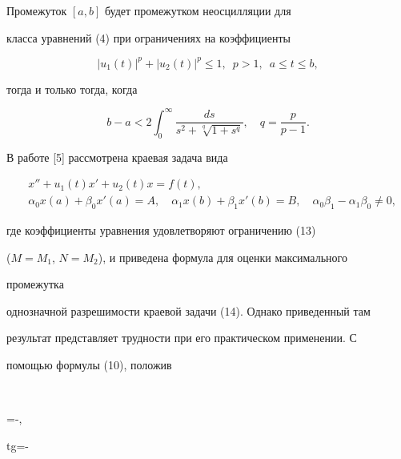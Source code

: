  


\begin{cor} 


Промежуток $[a,b]$ будет промежутком неосцилляции для 


класса уравнений (4) при ограничениях на коэффициенты 


$$ 


|u_1(t)|^p+|u_2(t)|^p\le1,\ \; p>1,\ \; a\le t\le b, 


$$ 


тогда и только тогда, когда 


$$ 


b-a<2\int^\infty_0\frac{d s}{s^2+\sqrt[q]{1+s^q}},\quad 


q=\frac{p}{p-1} .


$$ 


\end{cor} 


 


В работе [5] рассмотрена краевая задача вида 


\begin{equation} 


\begin{split} 


&x''+u_1(t)x'+u_2(t)x=f(t),\\


&\alpha_0x(a)+\beta_0x'(a)=A,\quad 


\alpha_1x(b)+\beta_1x'(b)=B,\quad 


\alpha_0\beta_1-\alpha_1\beta_0\ne0, 


\end{split} 


\end{equation} 


где коэффициенты уравнения удовлетворяют ограничению (13) 


($M=M_1$, $N=M_2$), и приведена формула для оценки максимального 


промежутка 


однозначной разрешимости краевой задачи (14). Однако приведенный там 


результат представляет трудности при его практическом применении. С 


помощью формулы (10), положив 


$$ 


\tg\alpha=-,\quad 


tg\beta=-\quad 


